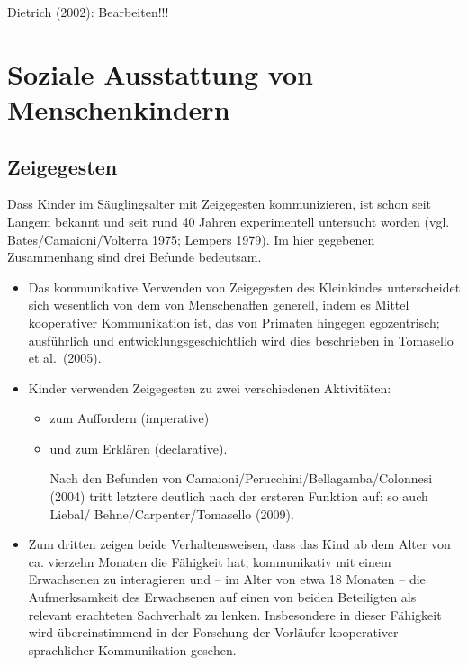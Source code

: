 \documentclass[
  letterpaper,
]{scrbook}
\begin{document}
Dietrich (2002): Bearbeiten!!!

\hypertarget{soziale-ausstattung-von-menschenkindern}{%
\section{Soziale Ausstattung von
Menschenkindern}\label{soziale-ausstattung-von-menschenkindern}}

\hypertarget{zeigegesten}{%
\subsection{Zeigegesten}\label{zeigegesten}}

Dass Kinder im Säuglingsalter mit Zeigegesten kommunizieren, ist schon
seit Langem bekannt und seit rund 40 Jahren experimentell untersucht
worden (vgl. Bates/Camaioni/Volterra 1975; Lempers 1979). Im hier
gegebenen Zusammenhang sind drei Befunde bedeutsam.

\begin{itemize}
\item
  Das kommunikative Verwenden von Zeigegesten des Kleinkindes
  unterscheidet sich wesentlich von dem von Menschenaffen generell,
  indem es Mittel kooperativer Kommunikation ist, das von Primaten
  hingegen egozentrisch; ausführlich und entwicklungsgeschichtlich wird
  dies beschrieben in Tomasello et al.~(2005).
\item
  Kinder verwenden Zeigegesten zu zwei verschiedenen Aktivitäten:

  \begin{itemize}
  \item
    zum Auffordern (imperative)
  \item
    und zum Erklären (declarative).

    Nach den Befunden von Camaioni/Perucchini/Bellagamba/Colonnesi
    (2004) tritt letztere deutlich nach der ersteren Funktion auf; so
    auch Liebal/ Behne/Carpenter/Tomasello (2009).
  \end{itemize}
\item
  Zum dritten zeigen beide Verhaltensweisen, dass das Kind ab dem Alter
  von ca. vierzehn Monaten die Fähigkeit hat, kommunikativ mit einem
  Erwachsenen zu interagieren und -- im Alter von etwa 18 Monaten -- die
  Aufmerksamkeit des Erwachsenen auf einen von beiden Beteiligten als
  relevant erachteten Sachverhalt zu lenken. Insbesondere in dieser
  Fähigkeit wird übereinstimmend in der Forschung der Vorläufer
  kooperativer sprachlicher Kommunikation gesehen.
\end{itemize}
\end{document}
